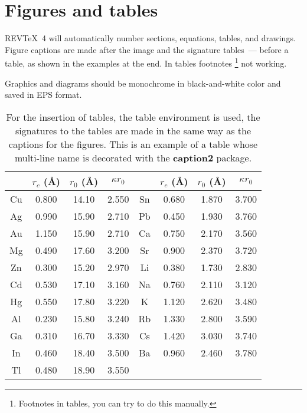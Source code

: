 \documentclass[
11pt,%
tightenlines,%
twoside,%
onecolumn,%
nofloats,%
nobibnotes,%
nofootinbib,%
superscriptaddress,%
noshowpacs,%
centertags]%
{revtex4}
\begin{document}
\section{Figures and tables}
REV\TeX~4 will automatically number sections, equations, tables, and
drawings. Figure captions are made after the image and the signature
tables~--- before a table, as shown in the examples at the end. In
tables footnotes \footnote{Footnotes in tables, you can try
to do this manually.} not working.

Graphics and diagrams should be monochrome in black-and-white color and saved in EPS format.

\begin{table}[!h]
\setcaptionmargin{0mm}
\onelinecaptionsfalse
{}
\caption{ For the insertion of tables, the table environment is used,
 the signatures to the tables are made in the same way as the captions
 for the figures. This is an example of a table whose multi-line name
 is decorated with the \textbf{caption2} package.}
\bigskip
\begin{tabular}{|c|c|c|c|c|c|c|c|}
\hline
 &$r_c$ (\AA)&$r_0$ (\AA)&$\kappa r_0$&
 &$r_c$ (\AA) &$r_0$ (\AA)&$\kappa r_0$\\
\hline
Cu& 0.800 & 14.10 & 2.550 &Sn
& 0.680 & 1.870 & 3.700 \\
Ag& 0.990 & 15.90 & 2.710 &Pb
& 0.450 & 1.930 & 3.760 \\
Au& 1.150 & 15.90 & 2.710 &Ca
& 0.750 & 2.170 & 3.560 \\
Mg& 0.490 & 17.60 & 3.200 &Sr
& 0.900 & 2.370 & 3.720 \\
Zn& 0.300 & 15.20 & 2.970 &Li
& 0.380 & 1.730 & 2.830 \\
Cd& 0.530 & 17.10 & 3.160 &Na
& 0.760 & 2.110 & 3.120 \\
Hg& 0.550 & 17.80 & 3.220 &K &  1.120 & 2.620 & 3.480 \\
Al& 0.230 & 15.80 & 3.240 &Rb & 1.330 & 2.800 & 3.590 \\
Ga& 0.310 & 16.70 & 3.330 &Cs & 1.420 & 3.030 & 3.740 \\
In& 0.460 & 18.40 & 3.500 &Ba & 0.960 & 2.460 & 3.780 \\
Tl& 0.480 & 18.90 & 3.550 & & & & \\[1mm]
\hline
\end{tabular}
\end{table}
\end{document}

